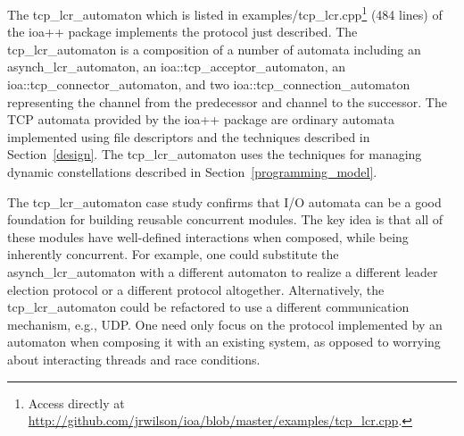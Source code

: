 The tcp\_lcr\_automaton which is listed in examples/tcp\_lcr.cpp\footnote{Access directly at \url{http://github.com/jrwilson/ioa/blob/master/examples/tcp_lcr.cpp}.} (484 lines) of the ioa++ package implements the protocol just described.
The tcp\_lcr\_automaton is a composition of a number of automata including an asynch\_lcr\_automaton, an ioa::tcp\_acceptor\_automaton, an ioa::tcp\_connector\_automaton, and two ioa::tcp\_connection\_automaton representing the channel from the predecessor and channel to the successor.
The TCP automata provided by the ioa++ package are ordinary automata implemented using file descriptors and the techniques described in Section~\ref{design}.
The tcp\_lcr\_automaton uses the techniques for managing dynamic constellations described in Section~\ref{programming_model}.

The tcp\_lcr\_automaton case study confirms that I/O automata can be a good foundation for building reusable concurrent modules.
The key idea is that all of these modules have well-defined interactions when composed, while being inherently concurrent.
For example, one could substitute the asynch\_lcr\_automaton with a different automaton to realize a different leader election protocol or a different protocol altogether.
Alternatively, the tcp\_lcr\_automaton could be refactored to use a different communication mechanism, e.g., UDP.
One need only focus on the protocol implemented by an automaton when composing it with an existing system, as opposed to worrying about interacting threads and race conditions.
\fi



